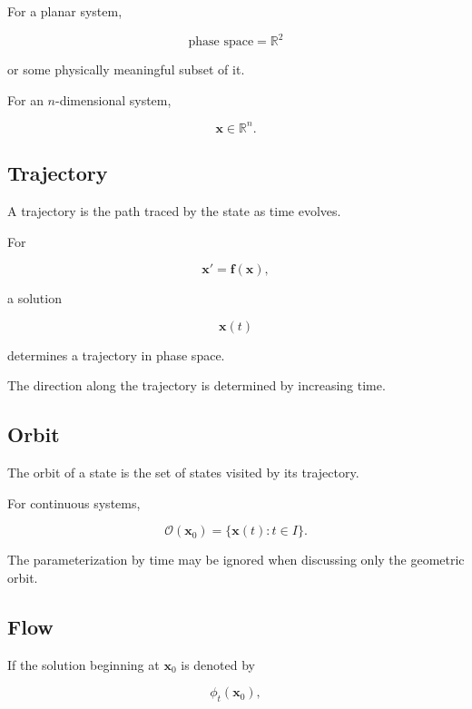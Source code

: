 For a planar system,

\[
\boxed{
\text{phase space}
=
\mathbb{R}^2
}
\]

or some physically meaningful subset of it.

For an \(n\)-dimensional system,

\[
\boxed{
\mathbf{x}
\in
\mathbb{R}^n.
}
\]

\subsection{Trajectory}
\label{subsec:trajectory-dynamical-system}

A trajectory is the path traced by the state as time evolves.

For

\[
\mathbf{x}'
=
\mathbf{f}(\mathbf{x}),
\]

a solution

\[
\mathbf{x}(t)
\]

determines a trajectory in phase space.

The direction along the trajectory is determined by increasing time.

\subsection{Orbit}
\label{subsec:orbit-dynamical-system}

The orbit of a state is the set of states visited by its trajectory.

For continuous systems,

\[
\boxed{
\mathcal{O}(\mathbf{x}_0)
=
\{
\mathbf{x}(t):
t\in I
\}.
}
\]

The parameterization by time may be ignored when discussing only the
geometric orbit.

\subsection{Flow}
\label{subsec:dynamical-flow}

If the solution beginning at \(\mathbf{x}_0\) is denoted by

\[
\phi_t(\mathbf{x}_0),
\]

